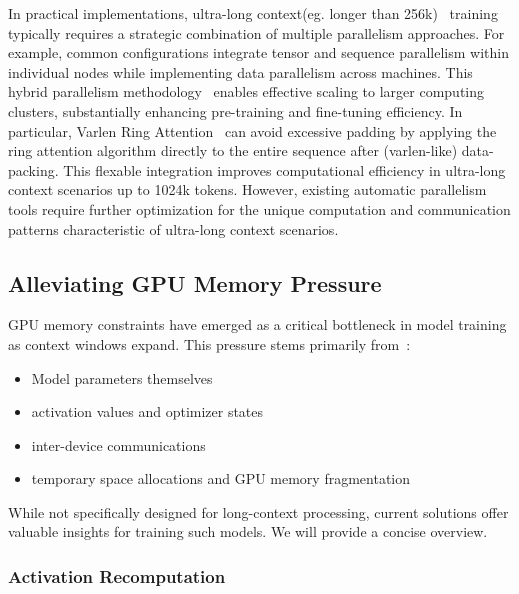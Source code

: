 In practical implementations, ultra-long context(eg. longer than 256k)~\citep{qwen2024qwen25technicalreport} training typically requires a strategic combination of multiple parallelism approaches. For example, common configurations integrate tensor and sequence parallelism within individual nodes while implementing data parallelism across machines. This hybrid parallelism methodology~\citep{Shoeybi2019MegatronLMTM, Narayanan2021EfficientLL, jacobs2023deepspeed, chen2024internevo, singh20234d, fujii2024acceleratinglargelanguagemodel, dubey2024llama} enables effective scaling to larger computing clusters, substantially enhancing pre-training and fine-tuning efficiency.  In particular, Varlen Ring Attention~\citep{minimax2025minimax01scalingfoundationmodels} can avoid excessive padding by applying the ring attention algorithm directly to the entire sequence after (varlen-like) data-packing. This flexable integration improves computational efficiency in ultra-long context scenarios up to 1024k tokens. However, existing automatic parallelism tools require further optimization for the unique computation and communication patterns characteristic of ultra-long context scenarios.

\subsection{Alleviating GPU Memory Pressure}\label{sec6_2}

GPU memory constraints have emerged as a critical bottleneck in model training as context windows expand. This pressure stems primarily from~\citep{gholami2024ai, guo2024survey, duan2024efficient}: 

\begin{itemize}[leftmargin=2em]
\item Model parameters themselves
\item activation values and optimizer states
\item inter-device communications
\item temporary space allocations and GPU memory fragmentation
\end{itemize}

While not specifically designed for long-context processing, current solutions offer valuable insights for training such models. We will provide a concise overview.

\subsubsection{Activation Recomputation}

